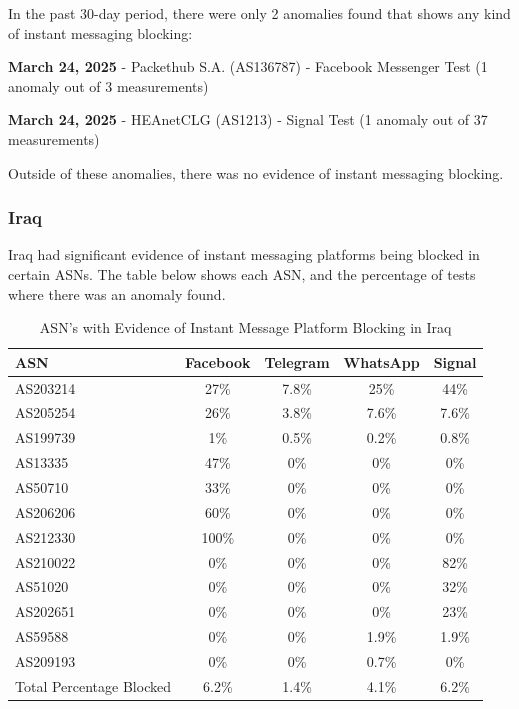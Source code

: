 In the past 30-day period, there were only 2 anomalies found that shows any kind of instant messaging blocking:

\textbf{March 24, 2025} - Packethub S.A. (AS136787) - Facebook Messenger Test (1 anomaly out of 3 measurements)

\textbf{March 24, 2025} - HEAnetCLG (AS1213) - Signal Test (1 anomaly out of 37 measurements)

Outside of these anomalies, there was no evidence of instant messaging blocking.

\subsubsection{Iraq}

Iraq had significant evidence of instant messaging platforms being blocked in certain ASNs. The table below shows each ASN, and the percentage of tests where there was an anomaly found.

\begin{table}[H]
\centering
\caption{ASN's with Evidence of Instant Message Platform Blocking in Iraq}
\begin{tabular}{lcccc}
\toprule
\textbf{ASN} & \textbf{Facebook} & \textbf{Telegram} & \textbf{WhatsApp} & \textbf{Signal} \\
\midrule
AS203214  & 27\%  & 7.8\% & 25\%  & 44\% \\
AS205254  & 26\%  & 3.8\% & 7.6\% & 7.6\% \\
AS199739  & 1\%   & 0.5\% & 0.2\% & 0.8\% \\
AS13335   & 47\%  & 0\%   & 0\%   & 0\% \\
AS50710   & 33\%  & 0\%   & 0\%   & 0\% \\
AS206206  & 60\%  & 0\%   & 0\%   & 0\% \\
AS212330  & 100\% & 0\%   & 0\%   & 0\% \\
AS210022  & 0\%   & 0\%   & 0\%   & 82\% \\
AS51020   & 0\%   & 0\%   & 0\%   & 32\% \\
AS202651  & 0\%   & 0\%   & 0\%   & 23\% \\
AS59588   & 0\%   & 0\%   & 1.9\% & 1.9\% \\
AS209193  & 0\%   & 0\%   & 0.7\% & 0\% \\
\bottomrule
Total Percentage Blocked  & 6.2\%   & 1.4\%   & 4.1\% & 6.2\% \\
\end{tabular}
\label{tab:category_block}
\end{table}

